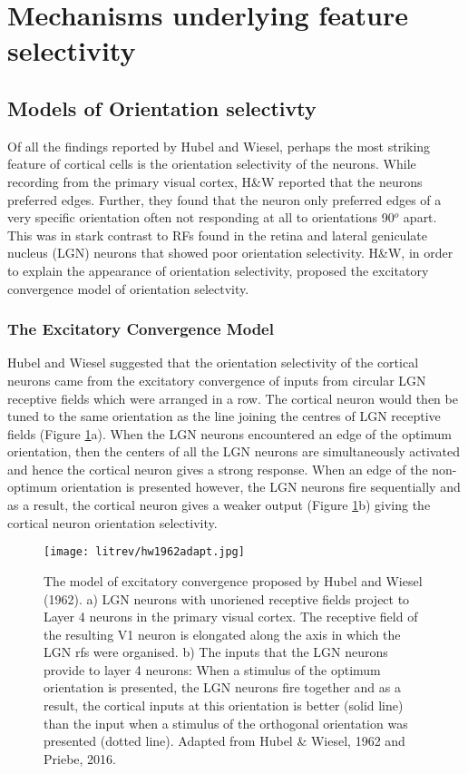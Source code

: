 \section{Mechanisms underlying feature selectivity}

\subsection{Models of Orientation selectivty}

Of all the findings reported by Hubel and Wiesel, perhaps the most striking feature of cortical cells is the orientation selectivity of the neurons. While recording from the primary visual cortex, H\&W reported that the neurons preferred edges. Further, they found that the neuron only preferred edges of a very specific orientation often not responding at all to orientations 90$^o$ apart. This was in stark contrast to RFs found in the retina and lateral geniculate nucleus (LGN) neurons that showed poor orientation selectivity. H\&W, in order to explain the appearance of orientation selectivity, proposed the excitatory convergence model of orientation selectvity.

\subsubsection{The Excitatory Convergence Model} Hubel and Wiesel suggested that the orientation selectivity of the cortical neurons came from the excitatory convergence of inputs from circular LGN receptive fields which were arranged in a row. The cortical neuron would then be tuned to the same orientation as the line joining the centres of LGN receptive fields (Figure \ref{fig:HW}a). When the LGN neurons encountered an edge of the optimum orientation, then the centers of all the LGN neurons are simultaneously activated and hence the cortical neuron gives a strong response. When an edge of the non-optimum orientation is presented however, the LGN neurons fire sequentially and as a result, the cortical neuron gives a weaker output (Figure \ref{fig:HW}b) giving the cortical neuron orientation selectivity.

	\begin{figure}[H]
	\centering
	\texttt{[image: litrev/hw1962adapt.jpg]}

	\caption{The model of excitatory convergence proposed by Hubel and Wiesel (1962). a) LGN neurons with unoriened receptive fields project to Layer 4 neurons in the primary visual cortex. The receptive field of the resulting V1 neuron is elongated along the axis in which the LGN rfs were organised. b) The inputs that the LGN neurons provide to layer 4 neurons: When a stimulus of the optimum orientation is presented, the LGN neurons fire together and as a result, the cortical inputs at this orientation is better (solid line) than the input when a stimulus of the orthogonal orientation was presented (dotted line). Adapted from Hubel \& Wiesel, 1962 and Priebe, 2016.}
	\label{fig:HW}
	\end{figure}


